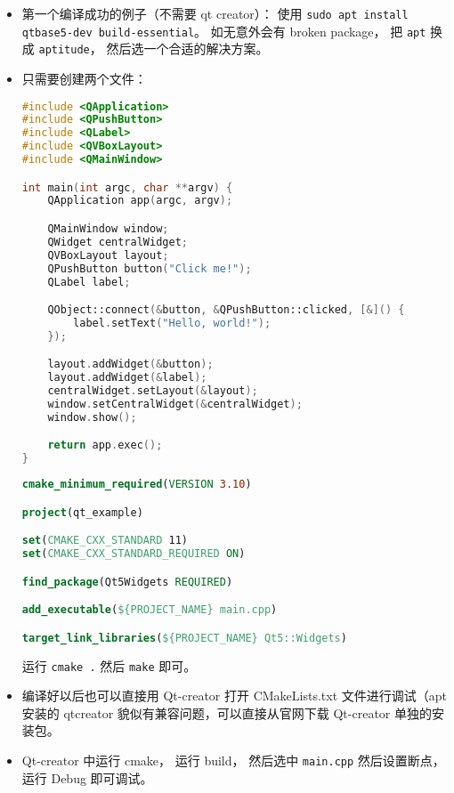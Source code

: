 \begin{itemize}
\item 第一个编译成功的例子（不需要 qt creator）： 使用 \verb|sudo apt install qtbase5-dev build-essential|。 如无意外会有 broken package， 把 \verb|apt| 换成 \verb|aptitude|， 然后选一个合适的解决方案。
\item 只需要创建两个文件：
\begin{lstlisting}[language=cpp,caption=main.cpp]
#include <QApplication>
#include <QPushButton>
#include <QLabel>
#include <QVBoxLayout>
#include <QMainWindow>

int main(int argc, char **argv) {
    QApplication app(argc, argv);

    QMainWindow window;
    QWidget centralWidget;
    QVBoxLayout layout;
    QPushButton button("Click me!");
    QLabel label;

    QObject::connect(&button, &QPushButton::clicked, [&]() {
        label.setText("Hello, world!");
    });

    layout.addWidget(&button);
    layout.addWidget(&label);
    centralWidget.setLayout(&layout);
    window.setCentralWidget(&centralWidget);
    window.show();

    return app.exec();
}
\end{lstlisting}
\begin{lstlisting}[language=cmake,caption=CMakeLists.txt]
cmake_minimum_required(VERSION 3.10)

project(qt_example)

set(CMAKE_CXX_STANDARD 11)
set(CMAKE_CXX_STANDARD_REQUIRED ON)

find_package(Qt5Widgets REQUIRED)

add_executable(${PROJECT_NAME} main.cpp)

target_link_libraries(${PROJECT_NAME} Qt5::Widgets)
\end{lstlisting}
运行 \verb|cmake .| 然后 \verb|make| 即可。
\item 编译好以后也可以直接用 Qt-creator 打开 CMakeLists.txt 文件进行调试（apt 安装的 qtcreator 貌似有兼容问题，可以直接从官网下载 Qt-creator 单独的安装包。
\item Qt-creator 中运行 cmake， 运行 build， 然后选中 \verb|main.cpp| 然后设置断点， 运行 Debug 即可调试。
\end{itemize}
